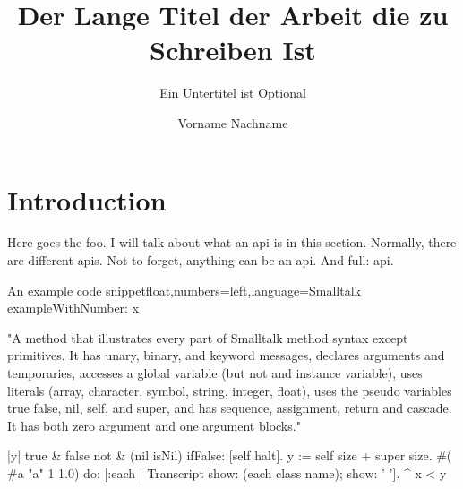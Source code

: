 \documentclass[draft,master]{swathesis}
\author{Vorname Nachname}
\title{Der Lange Titel der Arbeit die zu Schreiben Ist}
\subtitle{Ein Untertitel ist Optional}
\begin{document}
\frontmatter
\maketitle


\tableofcontents
\listoffigures
\listoftables
\lstlistoflistings
\listofacronyms %
\mainmatter
% 
% 
% 
% 
% 
% 
% 
%


\chapter{Introduction}
\label{cha:introduction}

\blindtext
\cite{Kay:2011:PCC:800193.1971922}




Here goes the foo.
I will talk about what an \ac{api} is in this section.
Normally, there are different \acp{api}. Not to forget,
anything can be an \ac{api}. And full: \acf{api}.

\begin{code}{An example code snippet}{float,numbers=left,language=Smalltalk}
exampleWithNumber: x

"A method that illustrates every part of Smalltalk method syntax
except primitives. It has unary, binary, and keyword messages,
declares arguments and temporaries, accesses a global variable
(but not and instance variable), uses literals (array, character,
symbol, string, integer, float), uses the pseudo variables
true false, nil, self, and super, and has sequence, assignment,
return and cascade. It has both zero argument and one argument blocks."

    |y|
    true & false not & (nil isNil) ifFalse: [self halt].
    y := self size + super size.
    #( #a "a" 1 1.0)
        do: [:each | Transcript show: (each class name);
                                 show: ' '].
     ^ x < y
\end{code}
\end{document}
